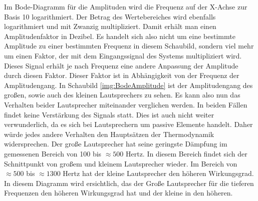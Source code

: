 Im Bode-Diagramm für die Amplituden wird die Frequenz auf der X-Achse zur Basis 10 logarithmiert. Der Betrag des Wertebereiches wird ebenfalls logarithmiert und mit Zwanzig multipliziert. Damit erhält man einen Amplitudenfaktor in Dezibel. Es handelt sich also nicht um eine bestimmte Amplitude zu einer bestimmten Frequenz in diesem Schaubild, sondern viel mehr um einen Faktor, der mit dem Eingangssignal des Systems multipliziert wird. Dieses Signal erhält je nach Frequenz eine andere Anpassung der Amplitude durch diesen Faktor. Dieser Faktor ist in Abhängigkeit von der Frequenz der Amplitudengang.
In Schaubild \ref{img:BodeAmplitude} ist der Amplitudengang des großen, sowie auch des kleinen Lautsprechers zu sehen.
Es kann also nun das Verhalten beider Lautsprecher miteinander verglichen werden. In beiden Fällen findet keine Verstärkung des Signals statt. Dies ist auch nicht weiter verwunderlich, da es sich bei Lautsprechern um passive Elemente handelt. Daher würde jedes andere Verhalten den Hauptsätzen der Thermodynamik widersprechen.
Der große Lautsprecher hat seine geringste Dämpfung im gemessenen Bereich von 100 bis $\approx 500$ Hertz. In diesem Bereich findet sich der Schnittpunkt von großem und kleinem Lautsprecher wieder. Im Bereich von $\approx 500$ bis $\approx 1300$ Hertz hat der kleine Lautsprecher den höheren Wirkungsgrad. In diesem Diagramm wird ersichtlich, das der Große Lautsprecher für die tieferen Frequenzen den höheren Wirkungsgrad hat und der kleine in den höheren.


